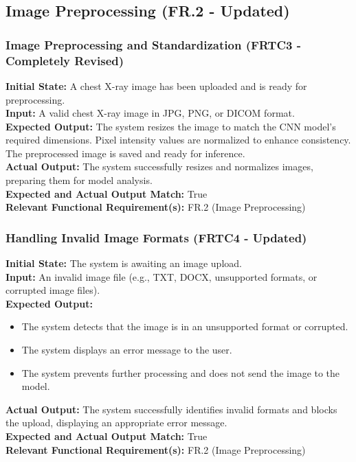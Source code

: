 \documentclass[12pt, titlepage]{article}
\begin{document}
\subsection{Image Preprocessing (FR.2 - Updated)}
\subsubsection{Image Preprocessing and Standardization (FRTC3 - Completely Revised)}
\textbf{Initial State:} A chest X-ray image has been uploaded and is ready for preprocessing.\\
\textbf{Input:} A valid chest X-ray image in JPG, PNG, or DICOM format.\\
\textbf{Expected Output:} The system resizes the image to match the CNN model's required dimensions.
Pixel intensity values are normalized to enhance consistency.
The preprocessed image is saved and ready for inference.\\
\textbf{Actual Output:} The system successfully resizes and normalizes images, preparing them for model analysis.\\
\textbf{Expected and Actual Output Match:} True\\
\textbf{Relevant Functional Requirement(s):} FR.2 (Image Preprocessing)\\

\subsubsection{Handling Invalid Image Formats (FRTC4 - Updated)}
\textbf{Initial State:} The system is awaiting an image upload.\\
\textbf{Input:} An invalid image file (e.g., TXT, DOCX, unsupported formats, or corrupted image files).\\
\textbf{Expected Output:}
\begin{itemize}
\item The system detects that the image is in an unsupported format or corrupted.
\item The system displays an error message to the user.
\item The system prevents further processing and does not send the image to the model.
\end{itemize}
\textbf{Actual Output:} The system successfully identifies invalid formats and blocks the upload, displaying an appropriate error message.\\
\textbf{Expected and Actual Output Match:} True\\
\textbf{Relevant Functional Requirement(s):} FR.2 (Image Preprocessing)\\
\end{document}
